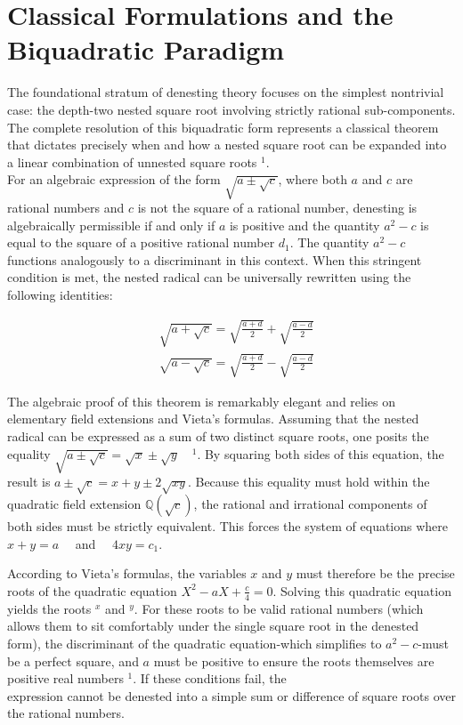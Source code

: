 \documentclass[10pt]{article}
\begin{document}
\section*{Classical Formulations and the Biquadratic Paradigm}
The foundational stratum of denesting theory focuses on the simplest nontrivial case: the depth-two nested square root involving strictly rational sub-components. The complete resolution of this biquadratic form represents a classical theorem that dictates precisely when and how a nested square root can be expanded into a linear combination of unnested square roots ${ }^{1}$.\\
For an algebraic expression of the form $\sqrt{a \pm \sqrt{c}}$, where both $a$ and $c$ are rational numbers and $c$ is not the square of a rational number, denesting is algebraically permissible if and only if $a$ is positive and the quantity $a^{2}-c$ is equal to the square of a positive rational number $d_{1}$. The quantity $a^{2}-c$ functions analogously to a discriminant in this context. When this stringent condition is met, the nested radical can be universally rewritten using the following identities:

$$
\begin{aligned}
& \sqrt{a+\sqrt{c}}=\sqrt{\frac{a+d}{2}}+\sqrt{\frac{a-d}{2}} \\
& \sqrt{a-\sqrt{c}}=\sqrt{\frac{a+d}{2}}-\sqrt{\frac{a-d}{2}}
\end{aligned}
$$

The algebraic proof of this theorem is remarkably elegant and relies on elementary field extensions and Vieta's formulas. Assuming that the nested radical can be expressed as a sum of two distinct square roots, one posits the equality $\sqrt{a \pm \sqrt{c}}=\sqrt{x} \pm \sqrt{y} \quad{ }^{1}$. By squaring both sides of this equation, the result is $a \pm \sqrt{c}=x+y \pm 2 \sqrt{x y}$. Because this equality must hold within the quadratic field extension $\mathbb{Q}(\sqrt{c})$, the rational and irrational components of both sides must be strictly equivalent. This forces the system of equations where $x+y=a \quad$ and $\quad 4 x y=c_{1}$.

According to Vieta's formulas, the variables $x$ and $y$ must therefore be the precise roots of the quadratic equation $X^{2}-a X+\frac{c}{4}=0$. Solving this quadratic equation yields the roots ${ }^{x}$ and ${ }^{y}$. For these roots to be valid rational numbers (which allows them to sit comfortably under the single square root in the denested form), the discriminant of the quadratic equation-which simplifies to $a^{2}-c$-must be a perfect square, and $a$ must be positive to ensure the roots themselves are positive real numbers ${ }^{1}$. If these conditions fail, the\\
expression cannot be denested into a simple sum or difference of square roots over the rational numbers.
\end{document}
